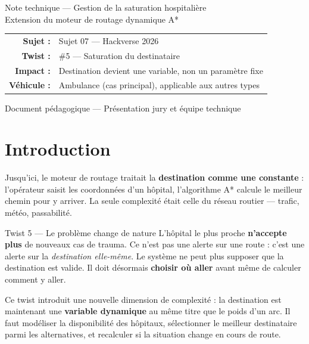 \documentclass[12pt,a4paper]{article}
\theoremstyle{definition}
\theoremstyle{remark}
\begin{document}
\begin{titlepage}
  {\large Note technique — Gestion de la saturation hospitalière}\\[1em]
  {\large\color{gray} Extension du moteur de routage dynamique A*}\\[3em]

  \begin{tabular}{rl}
    \textbf{Sujet :}    & Sujet 07 — Hackverse 2026 \\
    \textbf{Twist :}    & \#5 — Saturation du destinataire \\
    \textbf{Impact :}   & Destination devient une variable, non un paramètre fixe \\
    \textbf{Véhicule :} & Ambulance (cas principal), applicable aux autres types \\
  \end{tabular}

  \vfill
  {\small\color{gray} Document pédagogique — Présentation jury et équipe technique}
\end{titlepage}

\tableofcontents
\newpage

\section*{Introduction}

Jusqu'ici, le moteur de routage traitait la \textbf{destination comme une
constante} : l'opérateur saisit les coordonnées d'un hôpital, l'algorithme
A* calcule le meilleur chemin pour y arriver. La seule complexité était
celle du réseau routier — trafic, météo, passabilité.

\begin{twistbox}{Twist 5 — Le problème change de nature}
L'hôpital le plus proche \textbf{n'accepte plus} de nouveaux cas de trauma.
Ce n'est pas une alerte sur une route : c'est une alerte sur la
\emph{destination elle-même}. Le système ne peut plus supposer que la
destination est valide. Il doit désormais \textbf{choisir où aller}
avant même de calculer comment y aller.
\end{twistbox}

Ce twist introduit une nouvelle dimension de complexité : la destination
est maintenant une \textbf{variable dynamique} au même titre que le poids
d'un arc. Il faut modéliser la disponibilité des hôpitaux, sélectionner
le meilleur destinataire parmi les alternatives, et recalculer si la
situation change en cours de route.
\end{document}
